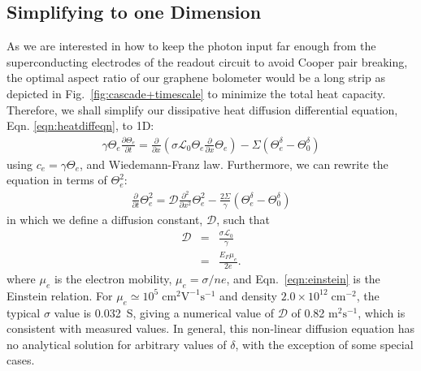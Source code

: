\documentclass[aip, amsmath,amssymb, reprint]{revtex4-1}
\newcommand{\ba}{\begin{eqnarray}}
\newcommand{\ea}{\end{eqnarray}}
\begin{document}
\subsection{Simplifying to one Dimension}
As we are interested in how to keep the photon input far enough from the superconducting electrodes of the readout circuit to avoid Cooper pair breaking, the optimal aspect ratio of our graphene bolometer would be a long strip as depicted in Fig.\ \ref{fig:cascade+timescale} to minimize the total heat capacity. Therefore, we shall simplify our dissipative heat diffusion differential equation, Eqn. \ref{eqn:heatdiffeqn}, to 1D:
\ba \gamma \Theta_{e} \frac{\partial \Theta_{e}}{\partial t} = \frac{\partial}{\partial x} \left( \sigma \mathcal{L}_{0} \Theta_e \frac{\partial}{\partial x} \Theta_e \right) - \Sigma \left( \Theta_{e}^{\delta} - \Theta_0^{\delta} \right) \label{eqn:heatdiffeqn_inbetween} \ea
using $c_{e} = \gamma \Theta_{e}$, and Wiedemann-Franz law. Furthermore, we can rewrite the equation in terms of $\Theta_{e}^2$:
\ba \frac{\partial}{\partial t} \Theta_e^2= \mathcal{D}\frac{\partial^2}{\partial x^2}\Theta_e^2 - \frac{2\Sigma}{\gamma}\left( \Theta_{e}^{\delta} - \Theta_0^{\delta} \right) \label{eqn:heatdiffeqn2}\ea
in which we define a diffusion constant, $\mathcal{D}$, such that
\ba \mathcal{D} &=& \frac{\sigma \mathcal{L}_0}{\gamma}\label{eqn:diffuse}\\
&=& \frac{E_F\mu_e}{2e}\label{eqn:einstein}.\ea
where $\mu_e$ is the electron mobility, $\mu_e=\sigma/ne$, and Eqn.\ \ref{eqn:einstein} is the Einstein relation\cite{Rengel.2013,Block.2021}. For $\mu_e \simeq 10^{5} \; \text{cm}^{2}\text{V}^{-1}\text{s}^{-1}$ and density $2.0 \times 10^{12} \; \text{cm}^{-2}$, the typical $\sigma$ value is 0.032~S, giving a numerical value of $\mathcal{D}$ of 0.82 $\text{m}^2\text{s}^{-1}$, which is consistent with measured values\cite{Ruzicka.2010,Block.2021}. In general, this non-linear diffusion equation has no analytical solution for arbitrary values of $\delta$, with the exception of some special cases.
\end{document}
